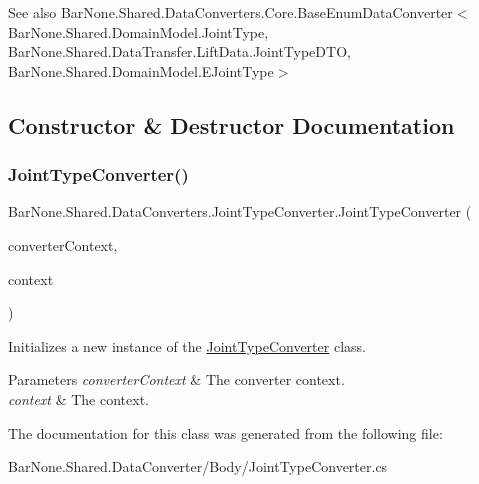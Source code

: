 \begin{DoxySeeAlso}{See also}
Bar\+None.\+Shared.\+Data\+Converters.\+Core.\+Base\+Enum\+Data\+Converter$<$\+Bar\+None.\+Shared.\+Domain\+Model.\+Joint\+Type, Bar\+None.\+Shared.\+Data\+Transfer.\+Lift\+Data.\+Joint\+Type\+D\+T\+O, Bar\+None.\+Shared.\+Domain\+Model.\+E\+Joint\+Type$>$


\end{DoxySeeAlso}


\subsection{Constructor \& Destructor Documentation}
\mbox{\label{class_bar_none_1_1_shared_1_1_data_converters_1_1_joint_type_converter_a43dbfa3f0a581e3ec3f87bcca1719f78}} 
\subsubsection{\texorpdfstring{Joint\+Type\+Converter()}{JointTypeConverter()}}
{\footnotesize\ttfamily Bar\+None.\+Shared.\+Data\+Converters.\+Joint\+Type\+Converter.\+Joint\+Type\+Converter (\begin{DoxyParamCaption}\item[{\mbox{\hyperlink{class_bar_none_1_1_shared_1_1_data_converters_1_1_converters}{Converters}}}]{converter\+Context,  }\item[{\mbox{\hyperlink{interface_bar_none_1_1_shared_1_1_core_1_1_i_domain_context}{I\+Domain\+Context}}}]{context }\end{DoxyParamCaption})}



Initializes a new instance of the \mbox{\hyperlink{class_bar_none_1_1_shared_1_1_data_converters_1_1_joint_type_converter}{Joint\+Type\+Converter}} class. 


\begin{DoxyParams}{Parameters}
{\em converter\+Context} & The converter context.\\
\hline
{\em context} & The context.\\
\hline
\end{DoxyParams}


The documentation for this class was generated from the following file\+:\begin{DoxyCompactItemize}
\item 
Bar\+None.\+Shared.\+Data\+Converter/\+Body/Joint\+Type\+Converter.\+cs\end{DoxyCompactItemize}
